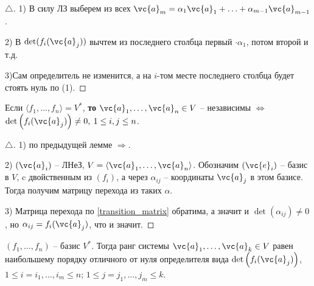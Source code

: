 \begin{proof}[$\triangle$]
	1) В силу ЛЗ выберем из всех $\vc{a}_m = \alpha_1 \vc{a}_1 + \ldots + \alpha_{m-1} \vc{a}_{m-1}$.

	2) В $\det(f_i(\vc{a}_j))$ вычтем из последнего столбца первый $\cdot \alpha_1$, потом второй и т.д. 

	3)Сам определитель не изменится, а на $i$-том месте последнего столбца будет стоять нуль по (1).
\end{proof}

\begin{to_lem}
	Если $\langle f_1,\ldots,f_n \rangle = V^*$, 
	\textbf{то} $\vc{a}_1,\ldots,\vc{a}_n \in V$ -- независимы $\Longleftrightarrow$ $\det\left( f_i (\vc{a}_j)\right) \neq 0, \: 1\leq i,j \leq n$.
\end{to_lem}

\begin{proof}[$\triangle$]
	1) по предыдущей лемме $\Rightarrow$.

	2) $(\vc{a}_i)$ -- ЛНеЗ, $V = \langle \vc{a}_1, \ldots, \vc{a}_n\rangle$. Обозначим $(\vc{e}_i)$ -- базис в $V$, c двойственным из $(f_i)$, а через $\alpha_{i j}$ -- координаты $\vc{a}_j$ в этом базисе. Тогда получим матрицу перехода из таких $\alpha$.

	3) Матрица перехода по \eqref{transition_matrix} обратима, а значит и $\det(\alpha_{i j}) \neq 0$, но $\alpha_{i j} = f_i(\vc{a}_j)$, что и значит.
\end{proof}

\begin{to_thr} 
	$(f_1,\ldots,f_n)$ -- базис $V^*$. Тогда ранг системы $\vc{a}_1,\ldots,\vc{a}_k \in V$ равен наибольшему порядку отличного от нуля определителя вида $\det\left(f_i(\vc{a}_j)\right)$, $1 \leq i = i_1,\ldots,i_m \leq n$; $1 \leq j = j_1,\ldots, j_m \leq k$.
\end{to_thr}

